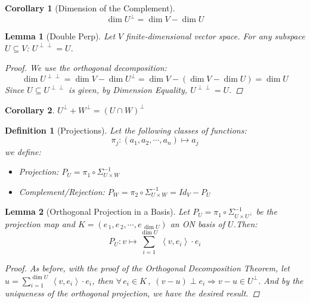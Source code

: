 \documentclass[12pt]{article}
\let\RA\Rightarrow
\newcommand{\Forall}[1]{\forall\,{#1}\,,\;}
\newcommand{\seq}[2]{\left({#1}_{\,1},{#1}_{\,2},\cdots,{#1}_{\,#2}\right)}
\newcommand{\inner}[2]{\left\langle{#1},{#2}\right\rangle}
\newtheorem{definition}{Definition}[subsection]
\newtheorem{lemma}{Lemma}[subsection]
\newtheorem{corollary}{Corollary}[subsection]
\begin{document}
\begin{corollary}[Dimension of the Complement]
  $$\dim U^\perp =\dim V-\dim U$$
\end{corollary}

\begin{lemma}[Double Perp]
  Let $V$ finite-dimensional vector space. For any subspace $U\subseteq V$: $U^{\perp\perp}=U$.
  \begin{proof}
    We use the orthogonal decomposition: $$\dim U^{\perp\perp}=\dim V-\dim U^\perp = \dim V-(\dim V-\dim U)=\dim U$$
    Since $U\subseteq U^{\perp\perp}$ is given, by Dimension Equality, $U^{\perp\perp}=U$.
  \end{proof}
\end{lemma}

\begin{corollary}
  $U^\perp+W^\perp=(U\cap W)^\perp$
\end{corollary}

\begin{definition}[Projections]
  Let the following classes of functions: $$\pi_j: (a_1,a_2,\cdots,a_n)\mapsto a_j$$
  we define:
  \begin{itemize}
    \item[] Projection: $P_U=\pi_1\circ \Sigma_{U\times W}^{-1}\,$
    \item[] Complement/Rejection: $P_W=\pi_2\circ \Sigma_{U\times W}^{-1}=Id_V-P_U\,$
  \end{itemize}
\end{definition}

\begin{lemma}[Orthogonal Projection in a Basis]
  Let $P_U=\pi_1\circ\Sigma_{U\times U^\perp}^{-1}$ be the projection map and $K=\seq{e}{\dim U}$ an ON basis of $U$.Then: $$P_U:v\mapsto\sum_{i=1}^{\dim U}\,\inner{v}{e_i}\cdot e_i$$
  \begin{proof}
    As before, with the proof of the Orthogonal Decomposition Theorem, let $u=\sum_{i=1}^{\dim U}\,\inner{v}{e_i}\cdot e_i$, then $\Forall{e_i\in K}(v-u)\perp e_i\RA v-u\in U^\perp$. And by the uniqueness of the orthogonal projection, we have the desired result.
  \end{proof}
\end{lemma}
\end{document}
